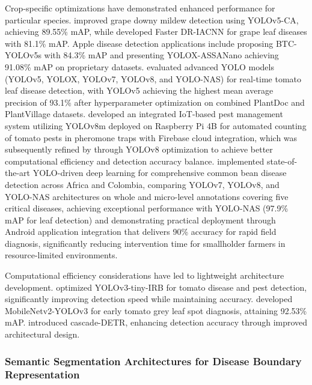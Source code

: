 \documentclass[sn-mathphys]{sn-jnl}
\theoremstyle{thmstyleone}%
\theoremstyle{thmstyletwo}%
\theoremstyle{thmstylethree}%
\begin{document}
Crop-specific optimizations have demonstrated enhanced performance for particular species. \citet{zhang2022deep} improved grape downy mildew detection using YOLOv5-CA, achieving 89.55\% mAP, while \citet{xie2020deep} developed Faster DR-IACNN for grape leaf diseases with 81.1\% mAP. Apple disease detection applications include \citet{li2023real} proposing BTC-YOLOv5s with 84.3\% mAP and \citet{liu2022improved} presenting YOLOX-ASSANano achieving 91.08\% mAP on proprietary datasets. \citet{bellout2024advanced} evaluated advanced YOLO models (YOLOv5, YOLOX, YOLOv7, YOLOv8, and YOLO-NAS) for real-time tomato leaf disease detection, with YOLOv5 achieving the highest mean average precision of 93.1\% after hyperparameter optimization on combined PlantDoc and PlantVillage datasets. \citet{zarboubi2023advancing} developed an integrated IoT-based pest management system utilizing YOLOv8m deployed on Raspberry Pi 4B for automated counting of tomato pests in pheromone traps with Firebase cloud integration, which was subsequently refined by \citet{zarboubi2024revolutionizing} through YOLOv8 optimization to achieve better computational efficiency and detection accuracy balance. \citet{gomez2024advancing} implemented state-of-the-art YOLO-driven deep learning for comprehensive common bean disease detection across Africa and Colombia, comparing YOLOv7, YOLOv8, and YOLO-NAS architectures on whole and micro-level annotations covering five critical diseases, achieving exceptional performance with YOLO-NAS (97.9\% mAP for leaf detection) and demonstrating practical deployment through Android application integration that delivers 90\% accuracy for rapid field diagnosis, significantly reducing intervention time for smallholder farmers in resource-limited environments.

Computational efficiency considerations have led to lightweight architecture development. \citet{wang2021diseases} optimized YOLOv3-tiny-IRB for tomato disease and pest detection, significantly improving detection speed while maintaining accuracy. \citet{liu2020early} developed MobileNetv2-YOLOv3 for early tomato grey leaf spot diagnosis, attaining 92.53\% mAP. \citet{ye2023cascade} introduced cascade-DETR, enhancing detection accuracy through improved architectural design.


\subsubsection{Semantic Segmentation Architectures for Disease Boundary Representation}
\end{document}

